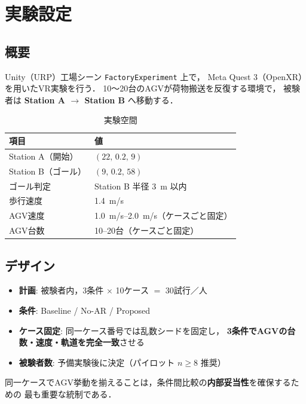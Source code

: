 \section{実験設定}
\label{sec:experiment}

\subsection{概要}

Unity（URP）工場シーン \texttt{FactoryExperiment} 上で，
Meta Quest 3（OpenXR）を用いたVR実験を行う．
10〜20台のAGVが荷物搬送を反復する環境で，
被験者は \textbf{Station A $\rightarrow$ Station B} へ移動する．

\begin{table}[htbp]
  \centering
  \caption{実験空間}
  \label{tab:layout}
  \begin{tabular}{ll}
    \toprule
    項目 & 値 \\
    \midrule
    Station A（開始） & $(22,\, 0.2,\, 9)$ \\
    Station B（ゴール） & $(9,\, 0.2,\, 58)$ \\
    ゴール判定 & Station B 半径 \SI{3}{m} 以内 \\
    歩行速度 & \SI{1.4}{m/s} \\
    AGV速度 & \SIrange{1.0}{2.0}{m/s}（ケースごと固定） \\
    AGV台数 & 10--20台（ケースごと固定） \\
    \bottomrule
  \end{tabular}
\end{table}

\subsection{デザイン}

\begin{itemize}[leftmargin=2em]
  \item \textbf{計画}: 被験者内，3条件 $\times$ 10ケース $=$ 30試行／人
  \item \textbf{条件}: Baseline / No-AR / Proposed
  \item \textbf{ケース固定}: 同一ケース番号では乱数シードを固定し，
        \textbf{3条件でAGVの台数・速度・軌道を完全一致}させる
  \item \textbf{被験者数}: 予備実験後に決定（パイロット $n \ge 8$ 推奨）
\end{itemize}

同一ケースでAGV挙動を揃えることは，条件間比較の\textbf{内部妥当性}を確保するための
最も重要な統制である．

